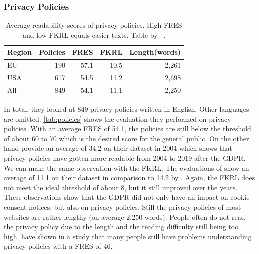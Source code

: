 \subsubsection{Privacy Policies}
\label{subsub:priv}

\begin{table}
    \begin{tabular}{ l r r r r }
        \hline
        Region & Policies & FRES & FKRL & Length(words) \\
        \hline
        EU & 190 & 57.1 & 10.5 & 2,261 \\
        USA & 617 & 54.5 & 11.2 & 2,698 \\
        All & 849 & 54.1 & 11.1 & 2,250 \\
        \hline
    \end{tabular}
    \caption{Average readability scores of privacy policies. High FRES and low FKRL equals easier texts. Table by
    \citeauthor{sanchez2019can}~\cite[Tab.~5]{sanchez2019can}.}
    \label{tab:policies}
\end{table}

In total, they looked at 849 privacy policies written in English. Other languages are omitted.
\autoref{tab:policies} shows the evaluation they performed on privacy policies. With an average FRES of 54.1, the
policies are still below the threshold of about 60 to 70 which is the desired score for the general public. On the
other hand  provide an average of 34.2 on their dataset in 2004 which shows that privacy policies
have gotten more readable from 2004 to 2019 after the GDPR. We can make the same observation with the FKRL. The
evaluations of \citeauthor{sanchez2019can} show an average
of 11.1 on their dataset in comparison to 14.2 by . Again, the FKRL does not meet the
ideal threshold of about 8, but it still improved over the years. These observations show that the GDPR did not only have
an impact on cookie consent notices, but also on privacy policies. Still the privacy policies of most websites are
rather lengthy (on average 2,250 words). People often do not read the privacy policy due to the length and the
reading difficulty still being too high.  have shown in a study that many people still have
problems understanding privacy policies with a FRES of 46.

